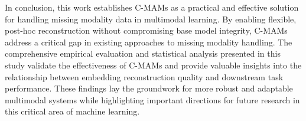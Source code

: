 In conclusion, this work establishes C-MAMs as a practical and effective solution for handling missing modality data in multimodal learning. By enabling flexible, post-hoc reconstruction without compromising base model integrity, C-MAMs address a critical gap in existing approaches to missing modality handling. The comprehensive empirical evaluation and statistical analysis presented in this study validate the effectiveness of C-MAMs and provide valuable insights into the relationship between embedding reconstruction quality and downstream task performance. These findings lay the groundwork for more robust and adaptable multimodal systems while highlighting important directions for future research in this critical area of machine learning.